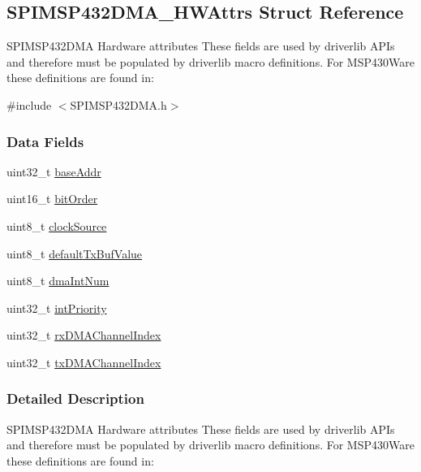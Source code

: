 \subsection{S\+P\+I\+M\+S\+P432\+D\+M\+A\+\_\+\+H\+W\+Attrs Struct Reference}
\label{struct_s_p_i_m_s_p432_d_m_a___h_w_attrs}


S\+P\+I\+M\+S\+P432\+D\+M\+A Hardware attributes These fields are used by driverlib A\+P\+Is and therefore must be populated by driverlib macro definitions. For M\+S\+P430\+Ware these definitions are found in\+:  




{\ttfamily \#include $<$S\+P\+I\+M\+S\+P432\+D\+M\+A.\+h$>$}

\subsubsection*{Data Fields}
\begin{DoxyCompactItemize}
\item 
uint32\+\_\+t \hyperlink{struct_s_p_i_m_s_p432_d_m_a___h_w_attrs_ac717a44bf8e6f70118fc8802bb79a1b8}{base\+Addr}
\item 
uint16\+\_\+t \hyperlink{struct_s_p_i_m_s_p432_d_m_a___h_w_attrs_ac3af678c0dbd1595ff87dea784278edf}{bit\+Order}
\item 
uint8\+\_\+t \hyperlink{struct_s_p_i_m_s_p432_d_m_a___h_w_attrs_a92b4e4a7b8a07a95c96328091d4b969d}{clock\+Source}
\item 
uint8\+\_\+t \hyperlink{struct_s_p_i_m_s_p432_d_m_a___h_w_attrs_a02b680a5c302e4303be9f045384b8dae}{default\+Tx\+Buf\+Value}
\item 
uint8\+\_\+t \hyperlink{struct_s_p_i_m_s_p432_d_m_a___h_w_attrs_a3a478ee4e4dce0ce76c6e894db179b47}{dma\+Int\+Num}
\item 
uint32\+\_\+t \hyperlink{struct_s_p_i_m_s_p432_d_m_a___h_w_attrs_a1be451f769c36e6924f5a25f63592cb2}{int\+Priority}
\item 
uint32\+\_\+t \hyperlink{struct_s_p_i_m_s_p432_d_m_a___h_w_attrs_ae317a28e3bc9f3da0ffa31f08569a3fe}{rx\+D\+M\+A\+Channel\+Index}
\item 
uint32\+\_\+t \hyperlink{struct_s_p_i_m_s_p432_d_m_a___h_w_attrs_a11be81dbcc615865601d1a3511324f1e}{tx\+D\+M\+A\+Channel\+Index}
\end{DoxyCompactItemize}


\subsubsection{Detailed Description}
S\+P\+I\+M\+S\+P432\+D\+M\+A Hardware attributes These fields are used by driverlib A\+P\+Is and therefore must be populated by driverlib macro definitions. For M\+S\+P430\+Ware these definitions are found in\+: 


